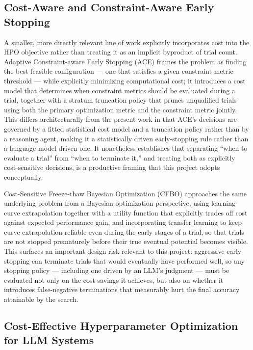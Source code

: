 \documentclass[11pt]{article}
\begin{document}
\subsection{Cost-Aware and Constraint-Aware Early Stopping}

A smaller, more directly relevant line of work explicitly incorporates cost into the HPO objective rather than treating it as an implicit byproduct of trial count. Adaptive Constraint-aware Early Stopping (ACE) frames the problem as finding the best feasible configuration --- one that satisfies a given constraint metric threshold --- while explicitly minimizing computational cost; it introduces a cost model that determines when constraint metrics should be evaluated during a trial, together with a stratum truncation policy that prunes unqualified trials using both the primary optimization metric and the constraint metric jointly. This differs architecturally from the present work in that ACE's decisions are governed by a fitted statistical cost model and a truncation policy rather than by a reasoning agent, making it a statistically driven early-stopping rule rather than a language-model-driven one. It nonetheless establishes that separating ``when to evaluate a trial'' from ``when to terminate it,'' and treating both as explicitly cost-sensitive decisions, is a productive framing that this project adopts conceptually.

Cost-Sensitive Freeze-thaw Bayesian Optimization (CFBO) approaches the same underlying problem from a Bayesian optimization perspective, using learning-curve extrapolation together with a utility function that explicitly trades off cost against expected performance gain, and incorporating transfer learning to keep curve extrapolation reliable even during the early stages of a trial, so that trials are not stopped prematurely before their true eventual potential becomes visible. This surfaces an important design risk relevant to this project: aggressive early stopping can terminate trials that would eventually have performed well, so any stopping policy --- including one driven by an LLM's judgment --- must be evaluated not only on the cost savings it achieves, but also on whether it introduces false-negative terminations that measurably hurt the final accuracy attainable by the search.

\subsection{Cost-Effective Hyperparameter Optimization for LLM Systems}
\end{document}
